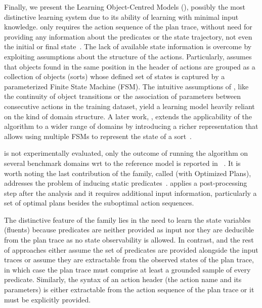 \vspace{0.15cm}


\textcolor[rgb]{1.00,0.00,0.00}{Finally, we present the Learning Object-Centred Models (\textbf{\LOCM}), possibly the most distinctive learning system due to its ability of learning with minimal input knowledge.} \textbf{\LOCM} only requires the \FO action sequence of the plan trace, without need for providing any information about the predicates or the state trajectory, not even the initial or final state~\cite{CresswellMW09,cresswell2013acquiring}. The lack of available state information is overcome by exploiting assumptions about the structure of the actions. Particularly, \LOCM assumes that objects found in the same position in the header of actions are grouped as a collection of objects (sorts) whose defined set of states is captured by a parameterized Finite State Machine (FSM). The intuitive assumptions of \LOCM, like the continuity of object transitions or the association of parameters between consecutive actions in the training dataset, yield a learning model heavily reliant on the kind of domain structure. A later work, \textbf{\LOCMtwo}, extends the applicability of the \LOCM algorithm to a wider range of domains by introducing a richer representation that allows using multiple FSMs to represent the state of a sort~\cite{cresswell2011generalised}.

\LOCMtwo is not experimentally evaluated, only the outcome of running the \LOCMtwo algorithm on several benchmark domains wrt to the reference model is reported in ~\cite{cresswell2011generalised}. It is worth noting the last contribution of the \LOCM family, called \textbf{\LOP} (\LOCM with Optimized Plans), addresses the problem of inducing static predicates~\cite{GregoryC16}. \LOP applies a post-processing step after the \LOCM analysis and it requires additional input information, particularly a set of optimal plans besides the suboptimal \FO action sequences.

\textcolor[rgb]{1.00,0.00,0.00}{The distinctive feature of the \LOCM family lies in the need to learn the state variables (fluents) because predicates are neither provided as input nor they are deducible from the plan trace as no state observability is allowed. In contrast, \FAMA and the rest of approaches either assume the set of predicates are provided alongside the input traces or assume they are extractable from the observed states of the plan trace, in which case the plan trace must comprise at least a grounded sample of every predicate. Similarly, the syntax of an action header (the action name and its parameters) is either extractable from the action sequence of the plan trace or it must be explicitly provided.}

